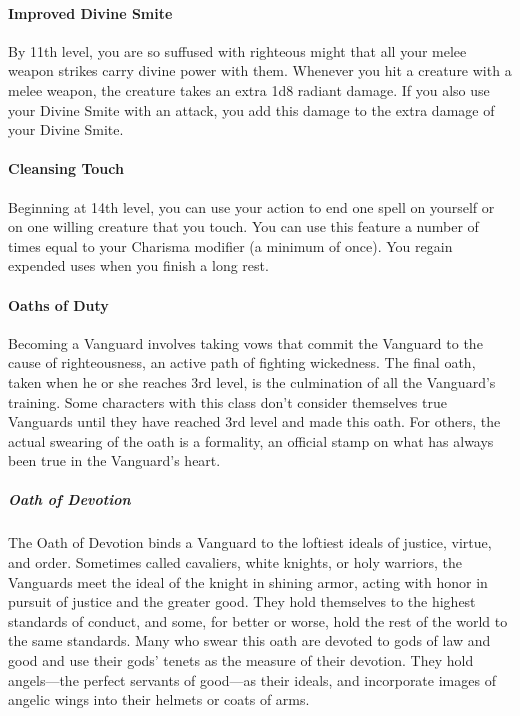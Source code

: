 \paragraph{Improved Divine
Smite}\label{vanguard-feature-improved-divine-smite}

By 11th level, you are so suffused with righteous might that all your
melee weapon strikes carry divine power with them. Whenever you hit a
creature with a melee weapon, the creature takes an extra 1d8 radiant
damage. If you also use your Divine Smite with an attack, you add this
damage to the extra damage of your Divine Smite.

\paragraph{Cleansing Touch}\label{vanguard-feature-cleansing-touch}

Beginning at 14th level, you can use your action to end one spell on
yourself or on one willing creature that you touch. You can use this
feature a number of times equal to your Charisma modifier (a minimum of
once). You regain expended uses when you finish a long rest.

\paragraph{Oaths of Duty}\label{vanguard-subclasses}

Becoming a Vanguard involves taking vows that commit the Vanguard to the
cause of righteousness, an active path of fighting wickedness. The final
oath, taken when he or she reaches 3rd level, is the culmination of all
the Vanguard's training. Some characters with this class don't consider
themselves true Vanguards until they have reached 3rd level and made
this oath. For others, the actual swearing of the oath is a formality,
an official stamp on what has always been true in the Vanguard's heart.

\subparagraph{Oath of
Devotion}\label{vanguard-subclasse-oath-of-devotion}

The Oath of Devotion binds a Vanguard to the loftiest ideals of justice,
virtue, and order. Sometimes called cavaliers, white knights, or holy
warriors, the Vanguards meet the ideal of the knight in shining armor,
acting with honor in pursuit of justice and the greater good. They hold
themselves to the highest standards of conduct, and some, for better or
worse, hold the rest of the world to the same standards. Many who swear
this oath are devoted to gods of law and good and use their gods' tenets
as the measure of their devotion. They hold angels---the perfect
servants of good---as their ideals, and incorporate images of angelic
wings into their helmets or coats of arms.

